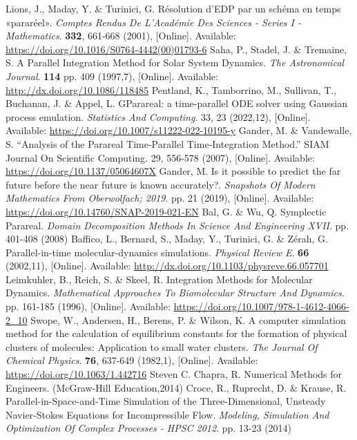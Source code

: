 \documentclass[conference]{IEEEtran}
\begin{document}
\begin{thebibliography}{00}
Lions, J., Maday, Y. \& Turinici, G. Résolution d'EDP par un schéma en temps «pararéel». {\em Comptes Rendus De L'Académie Des Sciences - Series I - Mathematics}. \textbf{332}, 661-668 (2001), [Online]. Available: \url{https://doi.org/10.1016/S0764-4442(00)01793-6}
Saha, P., Stadel, J. \& Tremaine, S. A Parallel Integration Method for Solar System Dynamics. {\em The Astronomical Journal}. \textbf{114} pp. 409 (1997,7), [Online]. Available: \url{http://dx.doi.org/10.1086/118485}
Pentland, K., Tamborrino, M., Sullivan, T., Buchanan, J. \& Appel, L. GParareal: a time-parallel ODE solver using Gaussian process emulation. {\em Statistics And Computing}. 33, 23 (2022,12), [Online]. Available: \url{https://doi.org/10.1007/s11222-022-10195-y}
Gander, M. \& Vandewalle, S. ``Analysis of the Parareal Time‐Parallel Time‐Integration Method.'' SIAM Journal On Scientific Computing. 29, 556-578 (2007), [Online]. Available: \url{https://doi.org/10.1137/05064607X}
Gander, M. Is it possible to predict the far future before the near future is known accurately?. {\em Snapshots Of Modern Mathematics From Oberwolfach; 2019}. pp. 21 (2019), [Online]. Available: \url{https://doi.org/10.14760/SNAP-2019-021-EN}
Bal, G. \& Wu, Q. Symplectic Parareal. {\em Domain Decomposition Methods In Science And Engineering XVII}. pp. 401-408 (2008)
Baffico, L., Bernard, S., Maday, Y., Turinici, G. \& Zérah, G. Parallel-in-time molecular-dynamics simulations. {\em Physical Review E}. \textbf{66} (2002,11), [Online]. Available: \url{http://dx.doi.org/10.1103/physreve.66.057701}
Leimkuhler, B., Reich, S. \& Skeel, R. Integration Methods for Molecular Dynamics. {\em Mathematical Approaches To Biomolecular Structure And Dynamics}. pp. 161-185 (1996), [Online]. Available: \url{https://doi.org/10.1007/978-1-4612-4066-2_10}
Swope, W., Andersen, H., Berens, P. \& Wilson, K. A computer simulation method for the calculation of equilibrium constants for the formation of physical clusters of molecules: Application to small water clusters. {\em The Journal Of Chemical Physics}. \textbf{76}, 637-649 (1982,1), [Online]. Available: \url{https://doi.org/10.1063/1.442716}
Steven C. Chapra, R. Numerical Methods for Engineers. (McGraw-Hill Education,2014)
Croce, R., Ruprecht, D. \& Krause, R. Parallel-in-Space-and-Time Simulation of the Three-Dimensional, Unsteady Navier-Stokes Equations for Incompressible Flow. {\em Modeling, Simulation And Optimization Of Complex Processes - HPSC 2012}. pp. 13-23 (2014)

\end{thebibliography}
\end{document}
